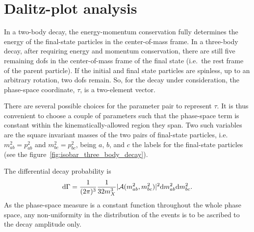 \section{Dalitz-plot analysis}

    In a two-body decay, the energy-momentum conservation fully determines the energy of the final-state particles in the center-of-mass frame.
    In a three-body decay, after requiring energy and momentum conservation, there are still five remaining \acp{dof} in the center-of-mass frame of the final state (i.e.~the rest frame of the parent particle).
    If the initial and final state particles are spinless, up to an arbitrary rotation, two \acp{dof} remain.
    So, for the decay under consideration, the phase-space coordinate, $\tau$, is a two-element vector.

   
   There are several possible choices for the parameter pair to represent $\tau$.
    It is thus convenient to choose a couple of parameters such that the phase-space term is constant within the kinematically-allowed region they span.
    Two such variables are the square invariant masses of the two pairs of final-state particles, i.e.~$m_{ab}^2 = p_{ab}^2$ and $m_{bc}^2 = p_{bc}^2$, being $a$, $b$, and $c$ the labels for the final-state particles (see the figure~\ref{fig:isobar_three_body_decay}).


    The differential decay probability is
    \begin{equation}
        \mathop{}\!\textup{d}\Gamma = \frac{1}{(2\pi)^3}\frac{1}{32 m_X^3}\lvert\mathcal{A}(m_{ab}^2, m_{bc}^2)\rvert^2\!
        \mathop{}\!\textup{d} m_{ab}^2 \!\mathop{}\!\textup{d} m_{bc}^2.
    \end{equation}
    As the phase-space measure is a constant function throughout the whole phase space, any non-uniformity in the distribution of the events is to be ascribed to the decay amplitude only.


